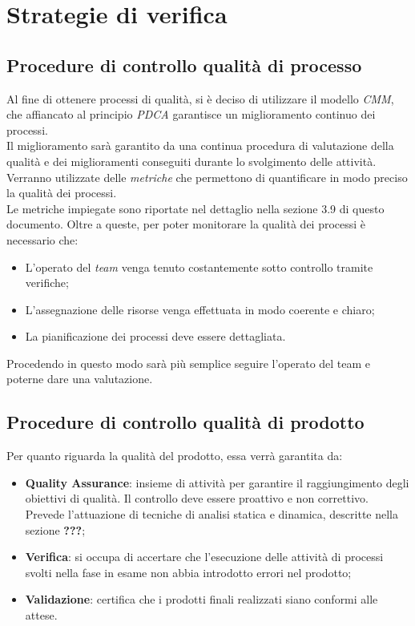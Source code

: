 \newpage
\section{Strategie di verifica}
\subsection{Procedure di controllo qualità di processo}
Al fine di ottenere processi di qualità, si è deciso di utilizzare il modello \textit{CMM}, che affiancato al principio \textit{PDCA} garantisce un miglioramento continuo dei processi.\\
Il miglioramento sarà garantito da una continua procedura di valutazione della qualità e dei miglioramenti conseguiti durante lo svolgimento delle attività. Verranno utilizzate delle \textit{metriche} che permettono di quantificare in modo preciso la qualità dei processi.\\
Le metriche impiegate sono riportate nel dettaglio nella sezione 3.9 di questo documento. Oltre a queste, per poter monitorare la qualità dei processi è necessario che:
\begin{itemize}
\item L'operato del \textit{team} venga tenuto costantemente sotto controllo tramite verifiche;
\item L'assegnazione delle risorse venga effettuata in modo coerente e chiaro;
\item La pianificazione dei processi deve essere dettagliata.
\end{itemize}
Procedendo in questo modo sarà più semplice seguire l'operato del team e poterne dare una valutazione.

\subsection{Procedure di controllo qualità di prodotto}
Per quanto riguarda la qualità del prodotto, essa verrà garantita da:
\begin{itemize}
\item \textbf{Quality Assurance}: insieme di attività per garantire il raggiungimento degli obiettivi di qualità. Il controllo deve essere proattivo e non correttivo. Prevede l'attuazione di tecniche di analisi statica e dinamica, descritte nella sezione \textbf{???};
\item \textbf{Verifica}: si occupa di accertare che l'esecuzione delle attività di processi svolti nella fase in esame non abbia introdotto errori nel prodotto;
\item \textbf{Validazione}: certifica che i prodotti finali realizzati siano conformi alle attese. 
\end{itemize}

